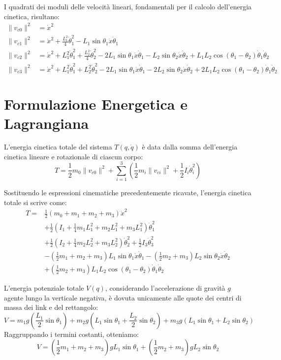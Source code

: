 \documentclass[11pt,a4paper]{article}
\begin{document}
	I quadrati dei moduli delle velocità lineari, fondamentali per il calcolo dell'energia cinetica, risultano:
	\begin{align}
		\|v_{c0}\|^2 &= \dot{x}^2 \\
		\|v_{c1}\|^2 &= \dot{x}^2 + \frac{L_1^2}{4}\dot{\theta}_1^2 - L_1\sin\theta_1 \dot{x}\dot{\theta}_1 \\
		\|v_{c2}\|^2 &= \dot{x}^2 + L_1^2\dot{\theta}_1^2 + \frac{L_2^2}{4}\dot{\theta}_2^2 - 2L_1\sin\theta_1 \dot{x}\dot{\theta}_1 - L_2\sin\theta_2 \dot{x}\dot{\theta}_2 + L_1 L_2\cos(\theta_1-\theta_2)\dot{\theta}_1\dot{\theta}_2 \\
		\label{eq:v3_sq} \|v_{c3}\|^2 &= \dot{x}^2 + L_1^2\dot{\theta}_1^2 + L_2^2\dot{\theta}_2^2 - 2L_1\sin\theta_1 \dot{x}\dot{\theta}_1 - 2L_2\sin\theta_2 \dot{x}\dot{\theta}_2 + 2L_1 L_2\cos(\theta_1-\theta_2)\dot{\theta}_1\dot{\theta}_2
	\end{align}
	
	\section{Formulazione Energetica e Lagrangiana}
	L'energia cinetica totale del sistema $T(q, \dot{q})$ è data dalla somma dell'energia cinetica lineare e rotazionale di ciascun corpo:
	\begin{equation}
		T = \frac{1}{2}m_0 \|v_{c0}\|^2 + \sum_{i=1}^3 \left( \frac{1}{2}m_i \|v_{ci}\|^2 + \frac{1}{2}I_{i}\dot{\theta}_i^2 \right)
	\end{equation}
	
	Sostituendo le espressioni cinematiche precedentemente ricavate, l'energia cinetica totale si scrive come:
	\begin{align}
		T = & \frac{1}{2}(m_0 + m_1 + m_2 + m_3)\dot{x}^2 \nonumber\\
		& + \frac{1}{2}\left(I_1 + \frac{1}{4}m_1 L_1^2 + m_2 L_1^2 + m_3 L_1^2\right)\dot{\theta}_1^2 \nonumber\\
		& + \frac{1}{2}\left(I_2 + \frac{1}{4}m_2 L_2^2 + m_3 L_2^2\right)\dot{\theta}_2^2 + \frac{1}{2}I_3\dot{\theta}_3^2 \nonumber\\
		& - \left(\frac{1}{2}m_1 + m_2 + m_3\right)L_1\sin\theta_1 \dot{x}\dot{\theta}_1 - \left(\frac{1}{2}m_2 + m_3\right)L_2\sin\theta_2 \dot{x}\dot{\theta}_2 \nonumber\\
		& + \left(\frac{1}{2}m_2 + m_3\right)L_1 L_2\cos(\theta_1-\theta_2)\dot{\theta}_1\dot{\theta}_2
	\end{align}
	
	L'energia potenziale totale $V(q)$, considerando l'accelerazione di gravità $g$ agente lungo la verticale negativa, è dovuta unicamente alle quote dei centri di massa dei link e del rettangolo:
	\begin{equation}
		V = m_1 g \left(\frac{L_1}{2}\sin\theta_1\right) + m_2 g \left(L_1\sin\theta_1 + \frac{L_2}{2}\sin\theta_2\right) + m_3 g \left(L_1\sin\theta_1 + L_2\sin\theta_2\right)
	\end{equation}
	Raggruppando i termini costanti, otteniamo:
	\begin{equation}
		V = \left(\frac{1}{2}m_1 + m_2 + m_3\right)gL_1\sin\theta_1 + \left(\frac{1}{2}m_2 + m_3\right)gL_2\sin\theta_2
	\end{equation}
	
\end{document}
